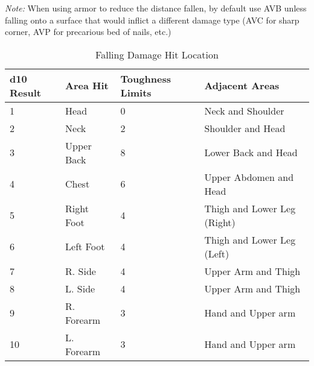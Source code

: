 \documentclass[oneside,11pt,english]{book}
\begin{document}
\emph{Note:} When using armor to reduce the distance fallen, by default use AVB
unless falling onto a surface that would inflict a different damage type (AVC
for sharp corner, AVP for precarious bed of nails, etc.) 


\begin{table}[ht]
	\centering
	\caption{Falling Damage Hit Location}
	\label{tab:falling-damage-hit-location}
	\begin{tabu} spread 0pt{X[-1,c] X X X[2]}
    d10 Result & Area Hit   & Toughness Limits & Adjacent Areas              \\           & Head       & 0                & Neck and Shoulder           \\
    2          & Neck       & 2                & Shoulder and Head           \\
    3          & Upper Back & 8                & Lower Back and Head         \\
    4          & Chest      & 6                & Upper Abdomen and Head      \\
    5          & Right Foot & 4                & Thigh and Lower Leg (Right) \\
    6          & Left Foot  & 4                & Thigh and Lower Leg (Left)  \\
    7          & R. Side    & 4                & Upper Arm and Thigh         \\
    8          & L. Side    & 4                & Upper Arm and Thigh         \\
    9          & R. Forearm & 3                & Hand and Upper arm          \\
    10         & L. Forearm & 3                & Hand and Upper arm          \\
	\end{tabu}
\end{table}
\end{document}
